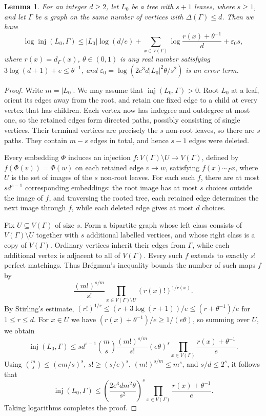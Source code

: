 \documentclass[10pt,a4paper]{amsart}
\numberwithin{equation}{section}
\newtheorem{lemma}[theorem]{Lemma}
\theoremstyle{definition}
\theoremstyle{remark}
\DeclareMathOperator{\inj}{inj}
\begin{document}
\begin{lemma}\label{lem:core-embeddings}
For an integer $d\ge2$, let $L_0$ be a tree with $s+1$ leaves,
where $s\ge1$, and let $\Gamma$ be a graph on the same number
of vertices with $\Delta(\Gamma)\le d$. Then we have
\[
 \log\inj(L_0,\Gamma)
 \le |L_0|\log(d/e)
 +\sum_{x\in V(\Gamma)}\log\frac{r(x)+\theta^{-1}}{d}
 +\varepsilon_0 s,
\]
where $r(x)=d_\Gamma(x)$, $\theta\in(0,1)$ is any real number
satisfying $3\log(d+1)+e\le\theta^{-1}$, and $\varepsilon_0=
 \log(2e^3d|L_0|^2\theta/s^2)$ is an error term.
\end{lemma}

\begin{proof}
Write $m=|L_0|$.  We may assume that $\inj(L_0,\Gamma)>0$. Root $L_0$ at a leaf, orient its edges away
from the root, and retain one fixed edge to a child at every vertex that has children. Each vertex now has indegree and outdegree at most one, so the retained edges form directed paths,
possibly consisting of single vertices. Their terminal vertices are precisely the $s$ non-root leaves, so there are $s$ paths. They contain $m-s$ edges in total, and hence $s-1$ edges were deleted.

Every embedding $\Phi$ induces an injection
$f:V(\Gamma)\setminus U\to V(\Gamma)$, defined by
$f(\Phi(v))=\Phi(w)$ on each retained edge $v\to w$,
satisfying $f(x)\sim_\Gamma x$, where $U$ is the set of images
of the $s$ non-root leaves. For each such $f$, there are at
most $sd^{s-1}$ corresponding embeddings: the root image has at most $s$ choices outside the image of $f$, and traversing the rooted tree, each retained edge determines the next image through $f$, while each deleted edge gives at most $d$ choices.

Fix $U\subseteq V(\Gamma)$ of size $s$. Form a bipartite
graph whose left class consists of $V(\Gamma)\setminus U$ together with
$s$ additional labelled vertices, and whose right class is a copy of $V(\Gamma)$. Ordinary vertices inherit their edges from
$\Gamma$, while each additional vertex is adjacent to all of
$V(\Gamma)$. Every such $f$ extends to exactly $s!$ perfect
matchings. Thus Br\'egman's inequality bounds the number
of such maps $f$ by
\[
 \frac{(m!)^{s/m}}{s!}
 \prod_{x\in V(\Gamma)\setminus U}(r(x)!)^{1/r(x)}.
\]
By Stirling's estimate,
$(r!)^{1/r}\le(r+3\log(r+1))/e
\le(r+\theta^{-1})/e$ for $1\le r\le d$.
For $x\in U$ we have
$(r(x)+\theta^{-1})/e\ge 1/(e\theta)$,
so summing over $U$, we obtain
\[
 \inj(L_0,\Gamma)
 \le sd^{s-1}\binom ms\frac{(m!)^{s/m}}{s!}
 (e\theta)^s
 \prod_{x\in V(\Gamma)}\frac{r(x)+\theta^{-1}}{e}.
\]
Using $\binom ms\le(em/s)^s$, $s!\ge(s/e)^s$,
$(m!)^{s/m}\le m^s$, and $s/d\le2^s$, it follows that
\[
 \inj(L_0,\Gamma)
 \le \left(\frac{2e^3dm^2\theta}{s^2}\right)^s
 \prod_{x\in V(\Gamma)}\frac{r(x)+\theta^{-1}}{e}.
\]
Taking logarithms completes the proof.
\end{proof}
\end{document}
